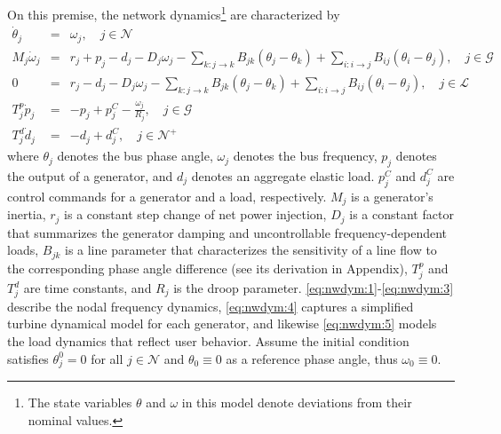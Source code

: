 \documentclass[journal,12pt,onecolumn,draftclsnofoot]{IEEEtran}
\begin{document}
On this premise, the network dynamics\footnote{The state variables $\theta$ and $\omega$ in this model denote deviations from their nominal values.} are characterized by
\begin{subequations}
	\begin{eqnarray}
	   \label{eq:nwdym:1}
	    \dot \theta_j  	& = &  \omega_j, \quad j\in\mathcal{N} \\
	   \label{eq:nwdym:2}
      	M_j \dot \omega_j & = & r_j+p_j - d_j -D_j \omega_j - \sum_{k:j\rightarrow k} B_{jk}(\theta_j-\theta_k) +\sum_{i:i\rightarrow j} B_{ij}(\theta_i-\theta_j)  , \quad j\in\mathcal{G} \\
        \label{eq:nwdym:3}
      	0 & = & r_j - d_j  -D_j \omega_j - \sum_{k:j\rightarrow k} B_{jk}(\theta_j-\theta_k) +\sum_{i:i\rightarrow j} B_{ij}(\theta_i-\theta_j) , \quad j\in\mathcal{L}  \\
        \label{eq:nwdym:4}
      	T_j^p \dot p_j & =  & -p_j + p_j^C-\frac{\omega_j}{R_j} , \quad j \in\mathcal{G} \\
        \label{eq:nwdym:5}
      	T_j^d \dot d_j & =  & -d_j + d_j^C , \quad j \in\mathcal{N}^+ 
 	\end{eqnarray}\label{eq:nwdym}%
\end{subequations}
where $\theta_j$ denotes the bus phase angle, $\omega_j$ denotes the bus frequency, $p_j$ denotes the output of a generator, and $d_j$ denotes an aggregate elastic load. $p_j^C$ and $d_j^C$ are control commands for a generator and a load, respectively. $M_j$ is a generator's inertia, $r_j$ is a constant step change of net power injection, $D_j$ is a constant factor that summarizes the generator damping and uncontrollable frequency-dependent loads, $B_{jk}$ is a line parameter that characterizes the sensitivity of a line flow to the corresponding phase angle difference (see its derivation in Appendix), $T_j^p$ and $T_j^d$ are time constants, and $R_j$ is the droop parameter. \eqref{eq:nwdym:1}-\eqref{eq:nwdym:3} describe the nodal frequency dynamics, \eqref{eq:nwdym:4} captures a simplified turbine dynamical model for each generator, and likewise \eqref{eq:nwdym:5} models the load dynamics that reflect user behavior. Assume the initial condition satisfies $\theta_j^0=0$ for all $j\in\mathcal{N}$ and $\theta_0 \equiv 0$ as a reference phase angle, thus $\omega_0 \equiv 0$. 
\end{document}
